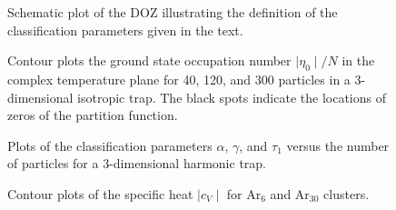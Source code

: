 %
%
\begin{figure}
\centerline{}
\caption{Schematic plot of the DOZ illustrating the 
definition of the classification parameters given in the text.}
\label{figure1}
\end{figure}
\begin{figure}
\centerline{}
\caption{Contour plots the ground state
occupation number $\mid \eta_0 \mid /N$ in the complex temperature
plane for 40, 120, and 300 particles in a 3-dimensional isotropic trap.
The black spots indicate the locations of zeros of the partition
function.}
\label{figure2}
\end{figure}
\begin{figure}
\centerline{}
\caption{Plots of the classification parameters $\alpha$, $\gamma$,
and $\tau_1$ versus the number of particles for a 3-dimensional 
harmonic trap.}
\label{figure3}
\end{figure}
\begin{figure}
\centerline{}
\caption{Contour plots of the specific heat $\mid c_V \mid$ for 
Ar$_6$ and Ar$_{30}$ clusters. }
\label{figure4}
\end{figure}
%
%
